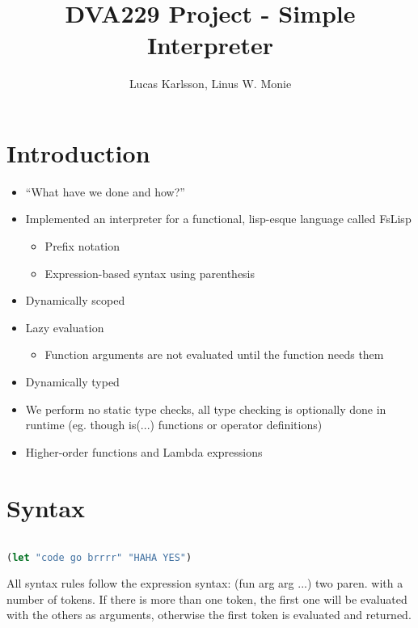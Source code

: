 \documentclass[11pt]{article}
\title{DVA229 Project - Simple Interpreter}
\author{Lucas Karlsson, Linus W. Monie}
\begin{document}
\maketitle

\section*{Introduction}
    \begin{itemize}
        \item “What have we done and how?”
        \item Implemented an interpreter for a functional, lisp-esque language called FsLisp
            \begin{itemize}
                \item Prefix notation
                \item Expression-based syntax using parenthesis
            \end{itemize}
        \item Dynamically scoped
        \item Lazy evaluation
            \begin{itemize}
                \item Function arguments are not evaluated until the function needs them
            \end{itemize}
        \item Dynamically typed
        \item We perform no static type checks, all type checking is optionally done in runtime (eg. though is(...) functions or operator definitions)
        \item Higher-order functions and Lambda expressions
    \end{itemize}


\section{Syntax}

\begin{lstlisting}[language=lisp]

(let "code go brrrr" "HAHA YES")

\end{lstlisting}
    
    All syntax rules follow the expression syntax: (fun arg arg ...)
    two paren. with a number of tokens. If there is more than one token, the first one will be evaluated with the others as arguments, otherwise the first token is evaluated and returned.
    
\end{document}
